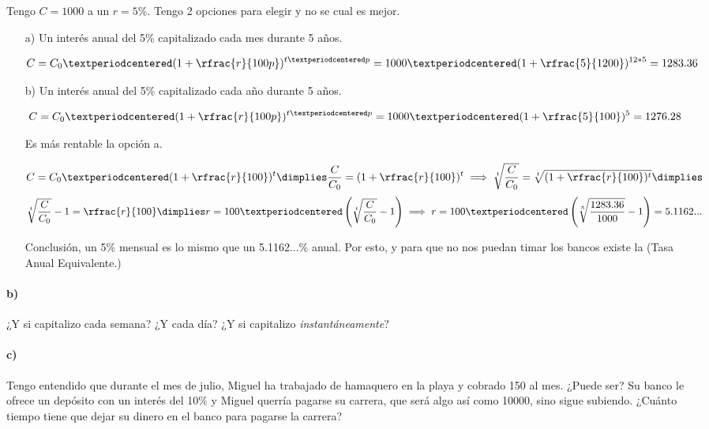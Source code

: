 \documentclass[palatino,nosec]{Docencia}
\begin{document}
\begin{example}

Tengo $C= 1000$ a un $r=5\%$. Tengo 2 opciones para elegir y no se cual es mejor. 

\begin{itemize}
	\item[a)] Un interés anual del 5\% capitalizado cada mes durante 5 años.

	\[
		C = C_0·(1+\rfrac{r}{100p})^{t·p} = 1000·(1+\rfrac{5}{1200})^{12*5} = 1283.36
	\]
	\item[b)] Un interés anual del 5\% capitalizado cada año durante 5 años.

	\[
		C = C_0·(1+\rfrac{r}{100p})^{t·p} = 1000·(1+\rfrac{5}{100})^{5} = 1276.28
	\]

	Es más rentable la opción a. 


	\[
		C = C_0·(1+\rfrac{r}{100})^{t} \dimplies \frac{C}{C_0} = (1+\rfrac{r}{100})^t \implies \sqrt[t]{\frac{C}{C_0}} = \sqrt[t]{(1+\rfrac{r}{100})^t} \dimplies
	\]
	\[
 		\sqrt[t]{\frac{C}{C_0}} -1 = \rfrac{r}{100} \dimplies r = 100·\left(\sqrt[t]{\frac{C}{C_0}} -1 \right)\implies r = 100·\left(\sqrt[5]{\frac{1283.36}{1000}} - 1\right) = 5.1162...
	\]

	Conclusión, un 5\% mensual es lo mismo que un 5.1162...\% anual. Por esto, y para que no nos puedan timar los bancos existe la  (Tasa Anual Equivalente.)


\end{itemize}
\end{example}

\paragraph{b)}
¿Y si capitalizo cada semana? ¿Y cada día? ¿Y si capitalizo \textit{instantáneamente}? 

\paragraph{c)}
Tengo entendido que durante el mes de julio, Miguel ha trabajado de hamaquero en la playa y cobrado 150 al mes. ¿Puede ser? Su banco le ofrece un depósito con un interés del 10\% y Miguel querría pagarse su carrera, que será algo así como 10000, sino sigue subiendo.
%
¿Cuánto tiempo tiene que dejar su dinero en el banco para pagarse la carrera?
\end{document}
